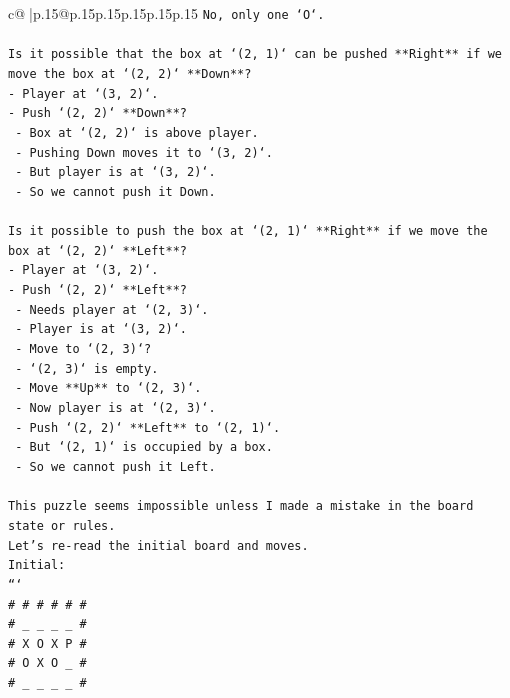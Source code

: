 \documentclass{article}
\begin{document}
{\begin{supertabular}{c@{$\;$}|p{.15\linewidth}@{}p{.15\linewidth}p{.15\linewidth}p{.15\linewidth}p{.15\linewidth}p{.15\linewidth}}
{{{\texttt{No, only one `O`.} \\
\\ 
\texttt{Is it possible that the box at `(2, 1)` can be pushed **Right** if we move the box at `(2, 2)` **Down**?} \\
\texttt{{-} Player at `(3, 2)`.} \\
\texttt{{-} Push `(2, 2)` **Down**?} \\
\texttt{  {-} Box at `(2, 2)` is above player.} \\
\texttt{  {-} Pushing Down moves it to `(3, 2)`.} \\
\texttt{  {-} But player is at `(3, 2)`.} \\
\texttt{  {-} So we cannot push it Down.} \\
\\ 
\texttt{Is it possible to push the box at `(2, 1)` **Right** if we move the box at `(2, 2)` **Left**?} \\
\texttt{{-} Player at `(3, 2)`.} \\
\texttt{{-} Push `(2, 2)` **Left**?} \\
\texttt{  {-} Needs player at `(2, 3)`.} \\
\texttt{  {-} Player is at `(3, 2)`.} \\
\texttt{  {-} Move to `(2, 3)`?} \\
\texttt{    {-} `(2, 3)` is empty.} \\
\texttt{    {-} Move **Up** to `(2, 3)`.} \\
\texttt{    {-} Now player is at `(2, 3)`.} \\
\texttt{    {-} Push `(2, 2)` **Left** to `(2, 1)`.} \\
\texttt{    {-} But `(2, 1)` is occupied by a box.} \\
\texttt{    {-} So we cannot push it Left.} \\
\\ 
\texttt{This puzzle seems impossible unless I made a mistake in the board state or rules.} \\
\texttt{Let's re{-}read the initial board and moves.} \\
\texttt{Initial:} \\
\texttt{```} \\
\texttt{\# \# \# \# \# \#} \\
\texttt{\# \_ \_ \_ \_ \#} \\
\texttt{\# X O X P \#} \\
\texttt{\# O X O \_ \#} \\
\texttt{\# \_ \_ \_ \_ \#} \\
}}}
\end{supertabular}}
\end{document}
